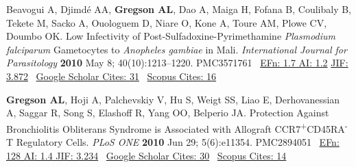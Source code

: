 \documentclass[letterpaper,10pt,sans,dvipsnames,final]{moderncv}%
\newcommand{\txsp}[1]{\textsuperscript{#1}}
\begin{document}
\begin{thebibliography}{1}
  \bibitem[15]{} Beavogui A, Djimd\'{e} AA, \textbf{Gregson AL}, Dao A, Maiga H, Fofana B, Coulibaly B, Tekete M, Sacko A, Ouologuem D, Niare O, Kone A, Toure AM, Plowe CV, Doumbo OK. Low Infectivity of Post-Sulfadoxine-Pyrimethamine \textit{Plasmodium falciparum} Gametocytes to \textit{Anopheles gambiae} in Mali. {\color{BrickRed}\textit{International Journal for Parasitology}} \textbf{2010} May 8; 40(10):1213--1220. \href{http://dx.doi.org/10.1016/j.ijpara.2010.04.010}{\aiDoi} {\smaller PMC3571761}~ 
      {\color{NavyBlue}\href{http://www.eigenfactor.org/rankings.php?search=INTERNATIONAL+JOURNAL+FOR+PARASITOLOGY&search2=&search3=&searchby=journal}{{\smaller EFn: 1.7 AI: 1.2}}
         \href{http://admin-apps.webofknowledge.com/JCR/JCR?RQ=RECORD&rank=1&journal=INT+J+PARASITOL}{{\smaller JIF: 3.872}}~
         \href{http://scholar.google.com/scholar?cites=13371683552743464380&as_sdt=2005&sciodt=0,5&hl=en}{{\smaller Google Scholar Cites: 31}}~
         \href{http://www.scopus.com/record/display.url?eid=2-s2.0-77954028849&origin=inward&txGid=2728424DD3A06399B3857C04F09A7B4B.N5T5nM1aaTEF8rE6yKCR3A%3a12}{{\smaller Scopus Cites: 16}}
         }

  \bibitem[16]{} \textbf{Gregson AL}, Hoji A, Palchevskiy V, Hu S, Weigt SS, Liao E, Derhovanessian A, Saggar R, Song S, Elashoff R, Yang OO, Belperio JA. Protection Against Bronchiolitis Obliterans Syndrome is Associated with Allograft {\smaller CCR}7\txsp{+}{\smaller CD}45RA\txsp{-} T Regulatory Cells. {\color{BrickRed}\textit{PLoS {\smaller ONE}}} \textbf{2010} Jun 29; 5(6):e11354. \href{http://dx.plos.org/10.1371/journal.pone.0011354}{\aiDoi} {\smaller PMC2894051}~ 
     {\color{NavyBlue} \href{http://admin-apps.isiknowledge.com/JCR/JCR?RQ=RECORD&rank=6&journal=PLOS+ONE}{{\smaller EFn: 128 AI: 1.4 JIF: 3.234}}~ 
      \href{http://scholar.google.com/scholar?cites=17706160008567303104&as_sdt=2005&sciodt=0,5&hl=en}{{\smaller Google Scholar Cites: 30}}~
      \href{http://www.scopus.com/record/display.uri?eid=2-s2.0-77955316535&origin=resultslist&sort=plf-f&src=s&nlo=1&nlr=20&nls=&sid=4E3F003C86CD3B740CA1877B02032D8B.y7ESLndDIsN8cE7qwvy6w%3a3832&sot=anl&sdt=aut&sl=36&s=AU-ID%28%22Gregson%2c+Aric+L.%22+6603096521%29&relpos=14&citeCnt=14&searchTerm=AU-ID%28%5C%26quot%3BGregson%2C+Aric+L.%5C%26quot%3B+6603096521%29}{{\smaller Scopus Cites: 14}}
      }


\end{thebibliography}
\end{document}
